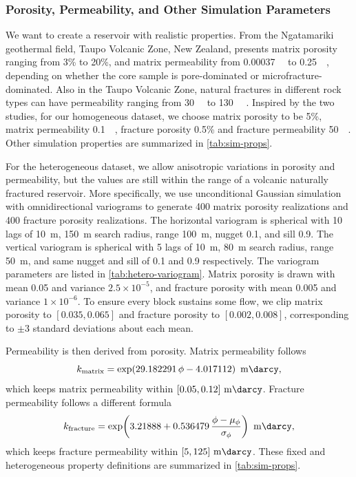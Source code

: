 \documentclass[pdflatex,sn-mathphys-ay]{sn-jnl}
\begin{document}
\subsubsection{Porosity, Permeability, and Other Simulation Parameters}
\label{sec:rock}

We want to create a reservoir with realistic properties. From the Ngatamariki geothermal field, Taupo Volcanic Zone, New Zealand, \cite{matrixTaupo}
presents matrix porosity ranging from 3\% to 20\%, and matrix permeability from \SI{0.00037}{\milli\darcy} to \SI{0.25}{\milli\darcy}, depending on whether the core
sample is pore-dominated or microfracture-dominated. Also in the Taupo Volcanic Zone, natural fractures in different rock types
can have permeability ranging from \SI{30}{\milli\darcy} to \SI{130}{\milli\darcy} \citep{fractureTaupo}. Inspired by the two studies, for our homogeneous dataset, we choose matrix porosity
to be 5\%, matrix permeability \SI{0.1}{\milli\darcy}, fracture porosity 0.5\% and fracture permeability \SI{50}{\milli\darcy}. Other simulation properties are summarized in \cref{tab:sim-props}.


For the heterogeneous dataset, we allow anisotropic variations in porosity and permeability, but the values are still within the range
of a volcanic naturally fractured reservoir. More specifically, we use unconditional Gaussian simulation with omnidirectional variograms
to generate 400 matrix porosity realizations and 400 fracture porosity realizations. The horizontal variogram is spherical with 10 lags of 
\SI{10}{\meter}, \SI{150}{\meter} search
radius, range \SI{100}{\meter}, nugget 0.1, and sill 0.9. The vertical variogram
is spherical with 5 lags of \SI{10}{\meter},
\SI{80}{\meter} search radius, range \SI{50}{\meter}, and same nugget and sill of 0.1 and 0.9 respectively. The variogram parameters are listed in \cref{tab:hetero-variogram}.
Matrix porosity is drawn with mean 0.05 and variance $2.5 \times 10^{-5}$, and
fracture porosity with mean 0.005 and variance $1 \times 10^{-6}$. To ensure
every block sustains some flow, we clip matrix porosity to $[0.035, 0.065]$ and
fracture porosity to $[0.002, 0.008]$, corresponding to $\pm 3$ standard
deviations about each mean.

Permeability is then derived from porosity. Matrix permeability follows
\begin{equation}
  k_{\text{matrix}} = \exp\!\left(29.182291\,\phi - 4.017112\right)\ \si{\milli\darcy},
  \label{eq:k-matrix}
\end{equation}
which keeps matrix permeability within $[0.05, 0.12]\ \si{\milli\darcy}$.
Fracture permeability follows a different formula
\begin{equation}
  k_{\text{fracture}} = \exp\!\left(3.21888 + 0.536479\,
    \frac{\phi - \mu_\phi}{\sigma_\phi}\right)\ \si{\milli\darcy},
  \label{eq:k-fracture}
\end{equation}
which keeps fracture permeability within $[5, 125]\ \si{\milli\darcy}$. These fixed and heterogeneous property definitions are summarized in \cref{tab:sim-props}. 
\end{document}
